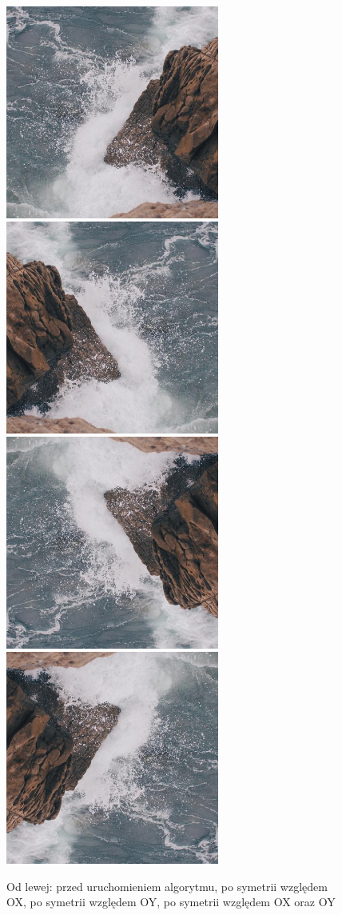 \documentclass[a4paper,12pt]{book}
\begin{document}
\begin{figure}[H]
	\caption{Od lewej: przed uruchomieniem algorytmu, po symetrii względem OX, po symetrii względem OY, po symetrii względem OX oraz OY}
	\includegraphics[width=7cm, height=7cm]{sea-unmodified.jpg}
	\includegraphics[width=7cm, height=7cm]{4-4/axis-symmetry-True-False-sea.png}
	\includegraphics[width=7cm, height=7cm]{4-4/axis-symmetry-False-True-sea.png}
	\includegraphics[width=7cm, height=7cm]{4-4/axis-symmetry-True-True-sea.png}
\end{figure}
\end{document}
